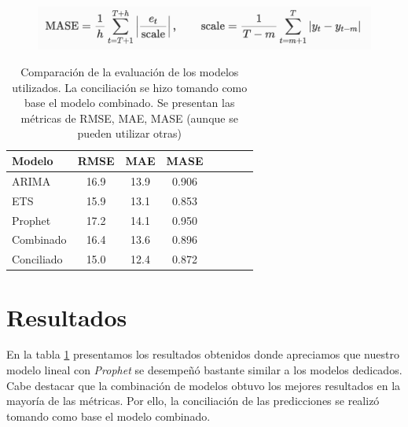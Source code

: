 \begin{figure}[!h]
\centering
      \includegraphics[width=120mm]{imgs/15_MASE_formula.png}
      \label{fig:snowyplot}
    \end{figure}




\begin{table}[!h]
    \centering
    \begin{tabular}{p{2cm}|c|c|c|c|c|c|c}
    Modelo  & RMSE & MAE  & MASE  \\
    \hline
    \hline
    ARIMA &   16.9 & 13.9 & 0.906 \\
    ETS &  15.9 & 13.1 & 0.853 \\
    Prophet &   17.2 & 14.1 &  0.950  \\
    Combinado &  16.4 & 13.6 & 0.896   \\
    Conciliado &  15.0 & 12.4 & 0.872  \\
    \hline
    \end{tabular}
    \caption{Comparación de la evaluación de los modelos utilizados. La conciliación se hizo tomando como base el modelo combinado. Se presentan las métricas de RMSE, MAE, MASE (aunque se pueden utilizar otras)}
    \label{tbl: res2}
\end{table}

\section{Resultados}

En la tabla \ref{tbl: res2} presentamos los resultados obtenidos donde apreciamos que nuestro modelo lineal con \textit{Prophet} se desempeñó bastante similar a los modelos dedicados. Cabe destacar que la combinación de modelos obtuvo los mejores resultados en la mayoría de las métricas. Por ello, la conciliación de las predicciones se realizó tomando como base el modelo combinado.

